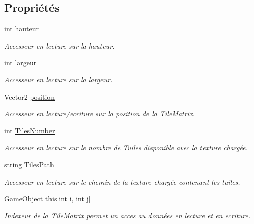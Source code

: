 \subsection*{Propriétés}
\begin{DoxyCompactItemize}
\item 
int \hyperlink{class_tile_matrix_a03b3e21bbee70f916ba6075150d8570b}{hauteur}
\begin{DoxyCompactList}\small\item\em Accesseur en lecture sur la hauteur. \end{DoxyCompactList}\item 
int \hyperlink{class_tile_matrix_adbffb02d3f0eba910ccbe6054a776105}{largeur}
\begin{DoxyCompactList}\small\item\em Accesseur en lecture sur la largeur. \end{DoxyCompactList}\item 
Vector2 \hyperlink{class_tile_matrix_ac005af42acbdcf02179ba2514d20f59a}{position}
\begin{DoxyCompactList}\small\item\em Accesseur en lecture/ecriture sur la position de la \hyperlink{class_tile_matrix}{Tile\+Matrix}. \end{DoxyCompactList}\item 
int \hyperlink{class_tile_matrix_a98329fd27bbbf07aa907efbd1b8a3822}{Tiles\+Number}
\begin{DoxyCompactList}\small\item\em Accesseur en lecture sur le nombre de Tuiles disponible avec la texture chargée. \end{DoxyCompactList}\item 
string \hyperlink{class_tile_matrix_aaff226a076c705b100bc8076ce3d025a}{Tiles\+Path}
\begin{DoxyCompactList}\small\item\em Accesseur en lecture sur le chemin de la texture chargée contenant les tuiles. \end{DoxyCompactList}\item 
Game\+Object \hyperlink{class_tile_matrix_a19ee238fde6e939b8d4eb6a23fd78563}{this\mbox{[}int i, int j\mbox{]}}
\begin{DoxyCompactList}\small\item\em Indexeur de la \hyperlink{class_tile_matrix}{Tile\+Matrix} permet un acces au données en lecture et en ecriture. \end{DoxyCompactList}\end{DoxyCompactItemize}


